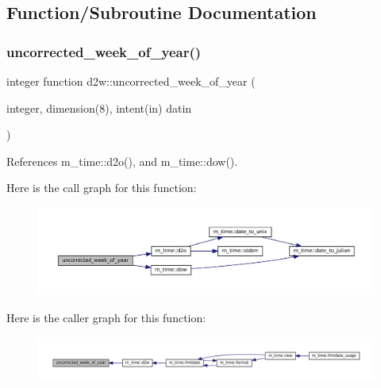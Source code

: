 \subsection{Function/\+Subroutine Documentation}
\mbox{\label{M__time_8f90_a4a68c5e906616f64da0c3d165fc41479}} 
\subsubsection{\texorpdfstring{uncorrected\+\_\+week\+\_\+of\+\_\+year()}{uncorrected\_week\_of\_year()}}
{\footnotesize\ttfamily integer function d2w\+::uncorrected\+\_\+week\+\_\+of\+\_\+year (\begin{DoxyParamCaption}\item[{integer, dimension(8), intent(in)}]{datin }\end{DoxyParamCaption})\hspace{0.3cm}{\ttfamily [private]}}



References m\+\_\+time\+::d2o(), and m\+\_\+time\+::dow().

Here is the call graph for this function\+:\nopagebreak
\begin{figure}[H]
\begin{center}
\leavevmode
\includegraphics[width=350pt]{M__time_8f90_a4a68c5e906616f64da0c3d165fc41479_cgraph}
\end{center}
\end{figure}
Here is the caller graph for this function\+:\nopagebreak
\begin{figure}[H]
\begin{center}
\leavevmode
\includegraphics[width=350pt]{M__time_8f90_a4a68c5e906616f64da0c3d165fc41479_icgraph}
\end{center}
\end{figure}
